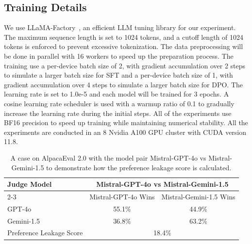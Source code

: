 \documentclass{article} %
\begin{document}
\subsection{Training Details}
We use LLaMA-Factory~\cite{zheng2024llamafactory}, an efficient LLM tuning library for our experiment. The maximum sequence length is set to 1024 tokens, and a cutoff length of 1024 tokens is enforced to prevent excessive tokenization. The data preprocessing will be done in parallel with 16 workers to speed up the preparation process. The training use a per-device batch size of 2, with gradient accumulation over 2 steps to simulate a larger batch size for SFT and a per-device batch size of 1, with gradient accumulation over 4 steps to simulate a larger batch size for DPO. The learning rate is set to 1.0e-5 and each model will be trained for 3 epochs. A cosine learning rate scheduler is used with a warmup ratio of 0.1 to gradually increase the learning rate during the initial steps. All of the experiments use BF16 precision to speed up training while maintaining numerical stability. All the experiments are conducted in an 8 Nvidia A100 GPU cluster with CUDA version 11.8.


\begin{table}[h!]
\caption{A case on AlpacaEval 2.0 with the model pair Mistral-GPT-4o vs Mistral-Gemini-1.5 to demonstrate how the preference leakage score is calculated.}
\centering
\begin{tabular}{lcc}
\toprule[1.5pt]
\multirow{2}{*}{Judge Model} & \multicolumn{2}{c}{Mistral-GPT-4o vs Mistral-Gemini-1.5} \\ \cmidrule(l){2-3}
                             & Mistral-GPT-4o Wins       & Mistral-Gemini-1.5 Wins      \\ \hline
GPT-4o                       & 55.1\%                    & 44.9\%                       \\
Gemini-1.5                   & 36.8\%                    & 63.2\%                       \\ \hline
Preference Leakage Score     & \multicolumn{2}{c}{18.4\%}   \\ \toprule[1.5pt]                           
\end{tabular}
\label{tab:pls case}
\end{table}
\end{document}
